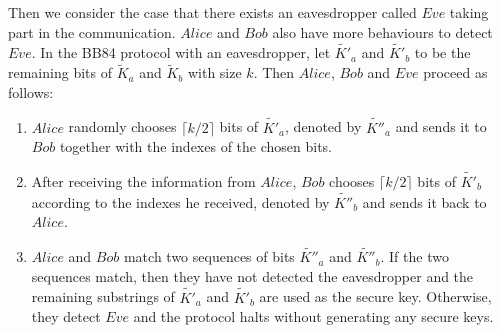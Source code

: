 \documentclass[a4paper,runningheads]{llncs}
\begin{document}
Then we consider the case that there exists an eavesdropper called $Eve$ taking part in the communication. $Alice$ and $Bob$ also have more behaviours to detect $Eve$. In the BB84 protocol with an eavesdropper, let $\tilde{K'}_a$ and $\tilde{K'}_b$ to be the remaining bits of $\tilde{K}_a$ and $\tilde{K}_b$ with size $k$. Then $Alice$, $Bob$ and $Eve$ proceed as follows:
\begin{enumerate}
	\item $Alice$ randomly chooses $\lceil k/2\rceil$ bits of $\tilde{K'}_a$, denoted by $\tilde{K''}_a$ and sends it to $Bob$ together with the indexes of the chosen bits.
	\item After receiving the information from $Alice$, $Bob$ chooses $\lceil k/2\rceil$ bits of $\tilde{K'}_b$ according to the indexes he received, denoted by $\tilde{K''}_b$ and sends it back to $Alice$.
	\item $Alice$ and $Bob$ match two sequences of bits $\tilde{K''}_{a}$ and $\tilde{K''}_{b}$. If the two sequences match, then they have not detected the eavesdropper and the remaining substrings of $\tilde{K'}_{a}$ and $\tilde{K'}_{b}$ are used as the secure key. Otherwise, they detect $Eve$ and the protocol halts without generating any secure keys.
\end{enumerate}
\end{document}
